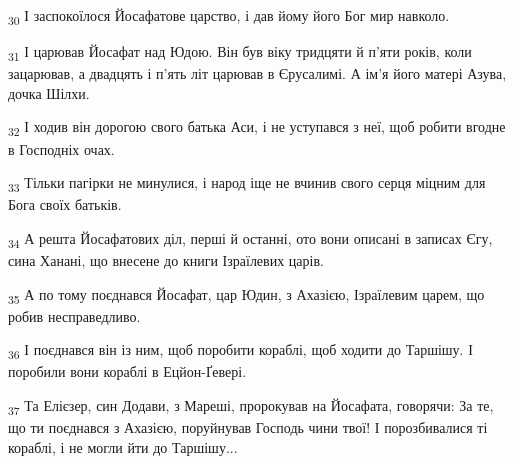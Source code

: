 \begin{tcolorbox}
\textsubscript{30} І заспокоїлося Йосафатове царство, і дав йому його Бог мир навколо.
\end{tcolorbox}
\begin{tcolorbox}
\textsubscript{31} І царював Йосафат над Юдою. Він був віку тридцяти й п'яти років, коли зацарював, а двадцять і п'ять літ царював в Єрусалимі. А ім'я його матері Азува, дочка Шілхи.
\end{tcolorbox}
\begin{tcolorbox}
\textsubscript{32} І ходив він дорогою свого батька Аси, і не уступався з неї, щоб робити вгодне в Господніх очах.
\end{tcolorbox}
\begin{tcolorbox}
\textsubscript{33} Тільки пагірки не минулися, і народ іще не вчинив свого серця міцним для Бога своїх батьків.
\end{tcolorbox}
\begin{tcolorbox}
\textsubscript{34} А решта Йосафатових діл, перші й останні, ото вони описані в записах Єгу, сина Ханані, що внесене до книги Ізраїлевих царів.
\end{tcolorbox}
\begin{tcolorbox}
\textsubscript{35} А по тому поєднався Йосафат, цар Юдин, з Ахазією, Ізраїлевим царем, що робив несправедливо.
\end{tcolorbox}
\begin{tcolorbox}
\textsubscript{36} І поєднався він із ним, щоб поробити кораблі, щоб ходити до Таршішу. І поробили вони кораблі в Ецйон-Ґевері.
\end{tcolorbox}
\begin{tcolorbox}
\textsubscript{37} Та Елієзер, син Додави, з Мареші, пророкував на Йосафата, говорячи: За те, що ти поєднався з Ахазією, поруйнував Господь чини твої! І порозбивалися ті кораблі, і не могли йти до Таршішу...
\end{tcolorbox}
